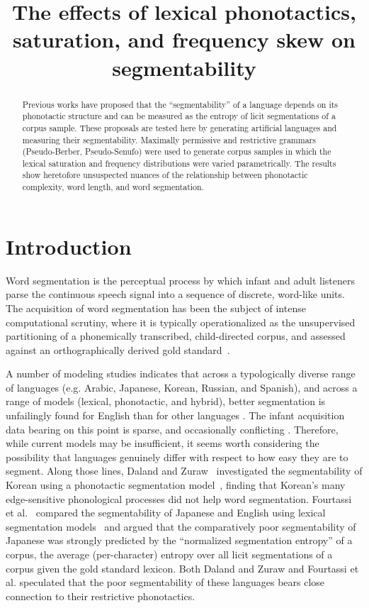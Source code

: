 \documentclass[11pt]{article}
\title{The effects of lexical phonotactics, saturation,
  and frequency skew on segmentability}
\date{}
\begin{document}
\maketitle
\begin{abstract}
  Previous works have proposed that the ``segmentability'' of a language
  depends on its phonotactic structure and can be measured as the
  entropy of licit segmentations of a corpus sample. These proposals
  are tested here by generating artificial languages and measuring
  their segmentability. Maximally permissive and restrictive grammars
  (Pseudo-Berber, Pseudo-Senufo) were used to generate corpus samples 
  in which the lexical saturation and frequency distributions were
  varied parametrically. The results show heretofore  unsuspected
  nuances of the relationship between phonotactic complexity, word
  length, and word segmentation.
\end{abstract}


\section{Introduction}
\vspace*{-5pt}
Word segmentation is the perceptual process by which infant and adult listeners parse the continuous speech signal into a sequence of discrete, word-like units. The acquisition of word segmentation has been the subject of intense computational scrutiny, where it is typically operationalized as the unsupervised partitioning of a phonemically transcribed, child-directed corpus, and assessed against an orthographically derived gold standard~\cite{Goldwater09a,Daland11a,Pearl10b}.

A number of modeling studies indicates that across a typologically diverse range of languages (e.g. Arabic, Japanese, Korean, Russian, and Spanish), and across a range of models (lexical, phonotactic, and hybrid), better segmentation is unfailingly found for English than for other languages \cite{Fleck08a,Daland09a,Fourtassi13a,Daland13a}. The infant acquisition data bearing on this point is sparse, and occasionally conflicting \cite{Nazzi06a,Nazzi14a}. Therefore, while current models may be insufficient, it seems worth considering the possibility that languages genuinely differ with respect to how easy they are to segment. Along those lines, Daland and Zuraw~ investigated the segmentability of Korean using a phonotactic segmentation model~\cite{Daland11a}, finding that Korean's many edge-sensitive phonological processes did not help word segmentation. Fourtassi et al.~ compared the segmentability of Japanese and English using lexical segmentation models~\cite{Goldwater09a,Johnson09a} and argued that the comparatively poor segmentability of Japanese was strongly predicted by the ``normalized segmentation entropy''  of a corpus, the average (per-character) entropy over all licit segmentations of a corpus given the gold standard lexicon. Both Daland and Zuraw and Fourtassi et al. speculated that the poor segmentability of these languages bears close connection to their restrictive phonotactics.
\end{document}

